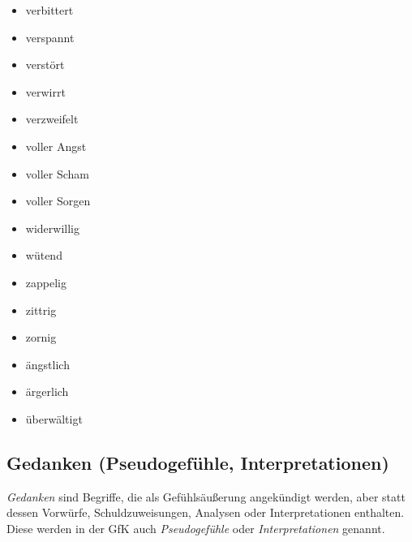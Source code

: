 \begin{multicols}{2}
\begin{itemize}
    \item verbittert
    \item verspannt
    \item verstört
    \item verwirrt
    \item verzweifelt
    \item voller Angst
    \item voller Scham
    \item voller Sorgen
    \item widerwillig
    \item wütend
    \item zappelig
    \item zittrig
    \item zornig
    \item ängstlich
    \item ärgerlich
    \item überwältigt
  \end{itemize}
\end{multicols}


\subsection{Gedanken (\glqq Pseudogefühle, Interpretationen\grqq)}
\label{pseudogefuehle}

\emph{Gedanken} sind Begriffe, die als Gefühlsäußerung angekündigt werden, aber statt dessen Vorwürfe, Schuldzuweisungen, Analysen oder Interpretationen enthalten. Diese werden in der GfK auch \emph{Pseudogefühle} oder \emph{Interpretationen} genannt.

